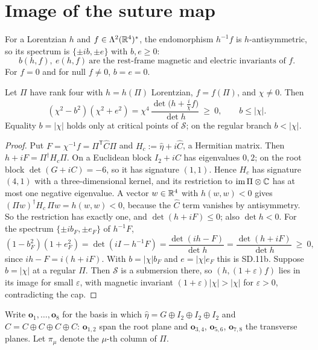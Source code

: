 \documentclass[10pt]{article}
\newcommand{\hateta}{\widehat\eta}
\newcommand{\hatC}{\widehat C}
\begin{document}
\section{Image of the suture map}

For a Lorentzian $h$ and $f\in\Lambda^2(\mathbb R^4)^*$, the endomorphism $h^{-1}f$
is $h$-antisymmetric, so its spectrum is $\{\pm ib,\pm e\}$ with $b,e\ge0$:
\[
b(h,f),\ e(h,f)\ \text{are the rest-frame magnetic and electric invariants of }f.
\tag{SD.11a}
\]
For $f=0$ and for null $f\ne0$, $b=e=0$.

\begin{proposition}
Let $\Pi$ have rank four with $h=h(\Pi)$ Lorentzian, $f=f(\Pi)$, and $\chi\ne0$. Then
\[
(\chi^2-b^2)(\chi^2+e^2)=\chi^4\,\frac{\det\bigl(h+\tfrac{i}{\chi}f\bigr)}{\det h}\ \ge\ 0,
\qquad b\le|\chi|.
\tag{SD.11b}
\]
Equality $b=|\chi|$ holds only at critical points of $\mathscr S$; on the
regular branch $b<|\chi|$.
\end{proposition}

\begin{proof}
Put $F=\chi^{-1}f=\Pi^{\mathsf T}\hatC\Pi$ and $H_c:=\hateta+i\hatC$, a
Hermitian matrix. Then $h+iF=\Pi^\dagger H_c\Pi$. On a Euclidean block
$I_2+iC$ has eigenvalues $0,2$; on the root block $\det(G+iC)=-6$, so it has
signature $(1,1)$. Hence $H_c$ has signature $(4,1)$ with a three-dimensional
kernel, and its restriction to $\operatorname{im}\Pi\otimes\mathbb C$ has at most one negative
eigenvalue. A vector $w\in\mathbb R^4$ with $h(w,w)<0$ gives
$(\Pi w)^\dagger H_c\,\Pi w=h(w,w)<0$, because the $\hatC$ term vanishes by
antisymmetry. So the restriction has exactly one, and $\det(h+iF)\le0$; also
$\det h<0$. For the spectrum $\{\pm ib_F,\pm e_F\}$ of $h^{-1}F$,
\[
(1-b_F^2)(1+e_F^2)=\det(iI-h^{-1}F)=\frac{\det(ih-F)}{\det h}
=\frac{\det(h+iF)}{\det h}\ \ge\ 0,
\]
since $ih-F=i(h+iF)$. With $b=|\chi|b_F$ and $e=|\chi|e_F$ this is SD.11b.
Suppose $b=|\chi|$ at a regular $\Pi$. Then $\mathscr S$ is a submersion
there, so $(h,(1+\varepsilon)f)$ lies in its image for small $\varepsilon$,
with magnetic invariant $(1+\varepsilon)|\chi|>|\chi|$ for $\varepsilon>0$,
contradicting the cap.
\end{proof}

Write $\mathbf o_1,\dots,\mathbf o_8$ for the basis in which
$\hateta=G\oplus I_2\oplus I_2\oplus I_2$ and $\hatC=C\oplus C\oplus C\oplus C$:
$\mathbf o_{1,2}$ span the root plane and $\mathbf o_{3,4}$,
$\mathbf o_{5,6}$, $\mathbf o_{7,8}$ the transverse planes. Let $\pi_\mu$
denote the $\mu$-th column of $\Pi$.
\end{document}
